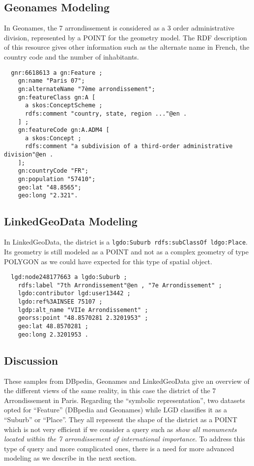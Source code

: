 \subsection{Geonames Modeling}
In Geonames, the 7 arrondissement is considered as a 3 order administrative division, represented by a POINT for the geometry model. The RDF description of this resource gives other information such as the alternate name in French, the country code and the number of inhabitants.
{\scriptsize
\begin{verbatim}
  gnr:6618613 a gn:Feature ;
    gn:name "Paris 07";
    gn:alternateName "7ème arrondissement";
    gn:featureClass gn:A [
      a skos:ConceptScheme ;
      rdfs:comment "country, state, region ..."@en .
    ] ;
    gn:featureCode gn:A.ADM4 [
      a skos:Concept ;
      rdfs:comment "a subdivision of a third-order administrative division"@en .
    ];
    gn:countryCode "FR";
    gn:population "57410";
    geo:lat "48.8565";
    geo:long "2.321".
\end{verbatim}
}

\subsection{LinkedGeoData Modeling}
In LinkedGeoData, the district is a \texttt{lgdo:Suburb rdfs:subClassOf ldgo:Place}. Its geometry is still modeled as a POINT and not as a complex geometry of type POLYGON as we could have expected for this type of spatial object.
{\scriptsize
\begin{verbatim}
  lgd:node248177663 a lgdo:Suburb ;
    rdfs:label "7th Arrondissement"@en , "7e Arrondissement" ;
    lgdo:contributor lgd:user13442 ;
    lgdo:ref%3AINSEE 75107 ;
    lgdp:alt_name "VIIe Arrondissement" ;
    georss:point "48.8570281 2.3201953" ;
    geo:lat 48.8570281 ;
    geo:long 2.3201953 .
\end{verbatim}
}

\subsection{Discussion}
These samples from DBpedia, Geonames and LinkedGeoData give an overview of the different views of the same reality, in this case the district of the 7 Arrondissement in Paris. Regarding the ``symbolic representation'', two datasets opted for ``Feature'' (DBpedia and Geonames) while LGD classifies it as a ``Suburb'' or ``Place''. They all represent the shape of the district as a POINT which is not very efficient if we consider a query such as \emph{show all monuments located within the 7 arrondissement of international importance}. To address this type of query and more complicated ones, there is a need for more advanced modeling as we describe in the next section.

